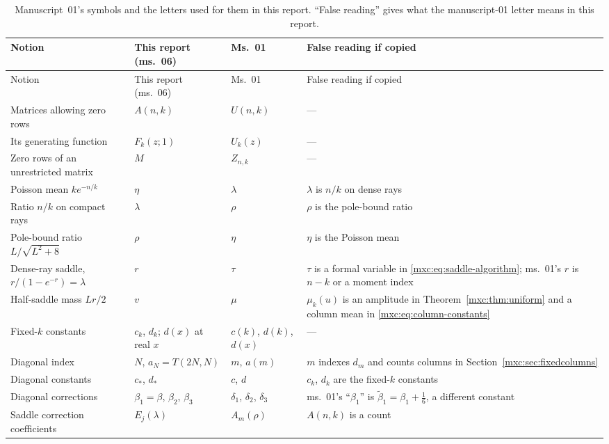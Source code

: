 \documentclass[11pt]{article}
\numberwithin{equation}{section}
\theoremstyle{definition}
\theoremstyle{remark}
\begin{document}
{\small
\setlength{\LTcapwidth}{\textwidth}
\begin{longtable}{@{}>{\raggedright\arraybackslash}p{}>{\raggedright\arraybackslash}p{}>{\raggedright\arraybackslash}p{}>{\raggedright\arraybackslash}p{}@{}}
\caption{Manuscript~01's symbols and the letters used for them in this
report. ``False reading'' gives what the manuscript-01 letter means in
this report.}\label{mxc:tab:dictionary}\\
\toprule
Notion & This report (ms.~06) & Ms.~01 & False reading if copied\\
\midrule
\endfirsthead
\toprule
Notion & This report (ms.~06) & Ms.~01 & False reading if copied\\
\midrule
\endhead
\bottomrule
\endfoot
Matrices allowing zero rows & $A(n,k)$ & $U(n,k)$ & ---\\
Its generating function & $F_k(z;1)$ & $U_k(z)$ & ---\\
Zero rows of an unrestricted matrix & $M$ & $Z_{n,k}$ & ---\\
Poisson mean $ke^{-n/k}$ & $\eta$ & $\lambda$ & $\lambda$ is $n/k$ on dense rays\\
Ratio $n/k$ on compact rays & $\lambda$ & $\rho$ & $\rho$ is the pole-bound ratio\\
Pole-bound ratio $L/\sqrt{L^2+8}$ & $\rho$ & $\eta$ & $\eta$ is the Poisson mean\\
Dense-ray saddle, $r/(1-e^{-r})=\lambda$ & $r$ & $\tau$ & $\tau$ is a formal variable in \eqref{mxc:eq:saddle-algorithm}; ms.~01's $r$ is $n-k$ or a moment index\\
Half-saddle mass $Lr/2$ & $v$ & $\mu$ & $\mu_k(u)$ is an amplitude in Theorem~\ref{mxc:thm:uniform} and a column mean in \eqref{mxc:eq:column-constants}\\
Fixed-$k$ constants & $c_k$, $d_k$; $d(x)$ at real $x$ & $c(k)$, $d(k)$, $d(x)$ & ---\\
Diagonal index & $N$, $a_N=T(2N,N)$ & $m$, $a(m)$ & $m$ indexes $d_m$ and counts columns in Section~\ref{mxc:sec:fixedcolumns}\\
Diagonal constants & $c_*$, $d_*$ & $c$, $d$ & $c_k$, $d_k$ are the fixed-$k$ constants\\
Diagonal corrections & $\beta_1=\beta$, $\beta_2$, $\beta_3$ & $\delta_1$, $\delta_2$, $\delta_3$ & ms.~01's ``$\beta_1$'' is $\widetilde\beta_1=\beta_1+\tfrac16$, a different constant\\
Saddle correction coefficients & $E_j(\lambda)$ & $A_m(\rho)$ & $A(n,k)$ is a count\\

\end{longtable}}
\end{document}
